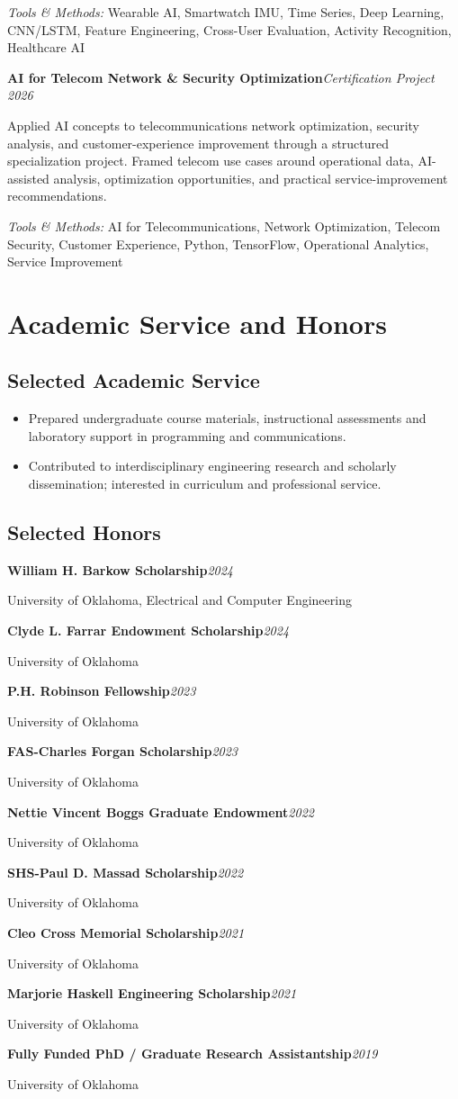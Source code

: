 \documentclass[8pt,letterpaper]{extarticle}
\newcommand{\entry}[2]{\Needspace{4\baselineskip}\textbf{#1}\hfill\textit{#2}\par}
\begin{document}
{\small\textit{Tools \& Methods:} Wearable AI, Smartwatch IMU, Time Series, Deep Learning, CNN/LSTM, Feature Engineering, Cross-User Evaluation, Activity Recognition, Healthcare AI\par}
\vspace{1pt}
\entry{AI for Telecom Network \& Security Optimization}{Certification Project \textbar{} 2026}
Applied AI concepts to telecommunications network optimization, security analysis, and customer-experience improvement through a structured specialization project. Framed telecom use cases around operational data, AI-assisted analysis, optimization opportunities, and practical service-improvement recommendations.\par
{\small\textit{Tools \& Methods:} AI for Telecommunications, Network Optimization, Telecom Security, Customer Experience, Python, TensorFlow, Operational Analytics, Service Improvement\par}
\vspace{1pt}
\section{Academic Service and Honors}
\subsection{Selected Academic Service}
\begin{itemize}
\item Prepared undergraduate course materials, instructional assessments and laboratory support in programming and communications.
\item Contributed to interdisciplinary engineering research and scholarly dissemination; interested in curriculum and professional service.
\end{itemize}
\subsection{Selected Honors}
\entry{William H. Barkow Scholarship}{2024}
{\small University of Oklahoma, Electrical and Computer Engineering\par}
\entry{Clyde L. Farrar Endowment Scholarship}{2024}
{\small University of Oklahoma\par}
\entry{P.H. Robinson Fellowship}{2023}
{\small University of Oklahoma\par}
\entry{FAS-Charles Forgan Scholarship}{2023}
{\small University of Oklahoma\par}
\entry{Nettie Vincent Boggs Graduate Endowment}{2022}
{\small University of Oklahoma\par}
\entry{SHS-Paul D. Massad Scholarship}{2022}
{\small University of Oklahoma\par}
\entry{Cleo Cross Memorial Scholarship}{2021}
{\small University of Oklahoma\par}
\entry{Marjorie Haskell Engineering Scholarship}{2021}
{\small University of Oklahoma\par}
\entry{Fully Funded PhD / Graduate Research Assistantship}{2019}
{\small University of Oklahoma\par}
\end{document}
